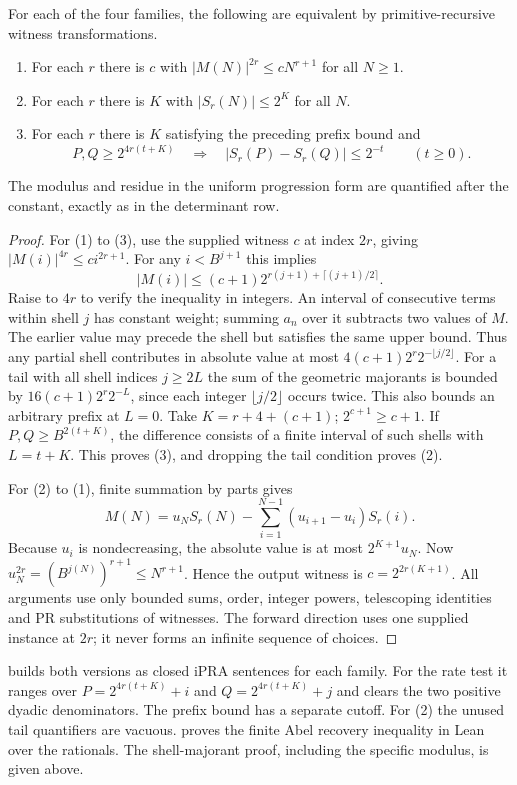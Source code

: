 \begin{theorem}\label{thm:rate}
For each of the four families, the following are equivalent by primitive-recursive witness transformations.
\begin{enumerate}
\item For each $r$ there is $c$ with $|M(N)|^{2r}\le cN^{r+1}$ for all $N\ge1$.
\item For each $r$ there is $K$ with $|S_r(N)|\le2^K$ for all $N$.
\item For each $r$ there is $K$ satisfying the preceding prefix bound and
\[
  P,Q\ge 2^{4r(t+K)}\quad\Longrightarrow\quad
  |S_r(P)-S_r(Q)|\le 2^{-t}\qquad(t\ge0).
\]
\end{enumerate}
The modulus and residue in the uniform progression form are quantified after the constant, exactly as in the determinant row.
\end{theorem}
\begin{proof}
For (1) to (3), use the supplied witness $c$ at index $2r$, giving $|M(i)|^{4r}\le c i^{2r+1}$. For any $i<B^{j+1}$ this implies
\[
 |M(i)|\le(c+1)2^{r(j+1)+\lceil(j+1)/2\rceil}.
\]
Raise to $4r$ to verify the inequality in integers. An interval of consecutive terms within shell $j$ has constant weight; summing $a_n$ over it subtracts two values of $M$. The earlier value may precede the shell but satisfies the same upper bound. Thus any partial shell contributes in absolute value at most $4(c+1)2^r2^{-\lfloor j/2\rfloor}$. For a tail with all shell indices $j\ge2L$ the sum of the geometric majorants is bounded by $16(c+1)2^r2^{-L}$, since each integer $\lfloor j/2\rfloor$ occurs twice. This also bounds an arbitrary prefix at $L=0$. Take $K=r+4+(c+1)$; $2^{c+1}\ge c+1$. If $P,Q\ge B^{2(t+K)}$, the difference consists of a finite interval of such shells with $L=t+K$. This proves (3), and dropping the tail condition proves (2).

For (2) to (1), finite summation by parts gives
\[
 M(N)=u_NS_r(N)-\sum_{i=1}^{N-1}(u_{i+1}-u_i)S_r(i).
\]
Because $u_i$ is nondecreasing, the absolute value is at most $2^{K+1}u_N$. Now $u_N^{2r}=(B^{j(N)})^{r+1}\le N^{r+1}$. Hence the output witness is $c=2^{2r(K+1)}$. All arguments use only bounded sums, order, integer powers, telescoping identities and PR substitutions of witnesses. The forward direction uses one supplied instance at $2r$; it never forms an infinite sequence of choices.
\end{proof}
 builds both versions as closed iPRA sentences for each family. For the rate test it ranges over $P=2^{4r(t+K)}+i$ and $Q=2^{4r(t+K)}+j$ and clears the two positive dyadic denominators. The prefix bound has a separate cutoff. For (2) the unused tail quantifiers are vacuous.  proves the finite Abel recovery inequality in Lean over the rationals. The shell-majorant proof, including the specific modulus, is given above.
